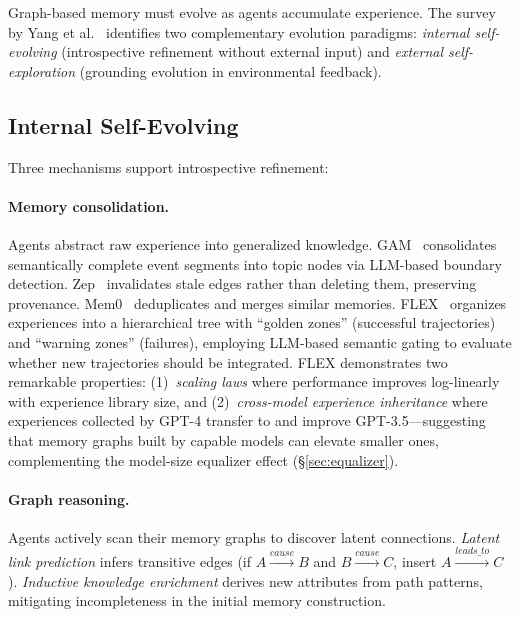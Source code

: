 \documentclass[hf]{ceurart}
\begin{document}
Graph-based memory must evolve as agents accumulate experience.
The survey by Yang et al.~\cite{graphmemsurvey2026} identifies two
complementary evolution paradigms: \emph{internal self-evolving}
(introspective refinement without external input) and \emph{external
self-exploration} (grounding evolution in environmental feedback).

\subsection{Internal Self-Evolving}

Three mechanisms support introspective refinement:

\paragraph{Memory consolidation.}
Agents abstract raw experience into generalized knowledge.
GAM~\cite{gam2026} consolidates semantically complete event segments
into topic nodes via LLM-based boundary detection.
Zep~\cite{rasmussen2025} invalidates stale edges rather than deleting
them, preserving provenance. Mem0~\cite{mem0_2025} deduplicates and
merges similar memories. FLEX~\cite{flex2025} organizes experiences
into a hierarchical tree with ``golden zones'' (successful trajectories)
and ``warning zones'' (failures), employing LLM-based semantic gating
to evaluate whether new trajectories should be integrated. FLEX
demonstrates two remarkable properties: (1)~\emph{scaling laws} where
performance improves log-linearly with experience library size, and
(2)~\emph{cross-model experience inheritance} where experiences
collected by GPT-4 transfer to and improve GPT-3.5---suggesting that
memory graphs built by capable models can elevate smaller ones,
complementing the model-size equalizer effect
(\S\ref{sec:equalizer}).

\paragraph{Graph reasoning.}
Agents actively scan their memory graphs to discover latent connections.
\emph{Latent link prediction} infers transitive edges
(if $A \xrightarrow{cause} B$ and $B \xrightarrow{cause} C$,
insert $A \xrightarrow{leads\_to} C$). \emph{Inductive knowledge
enrichment} derives new attributes from path patterns, mitigating
incompleteness in the initial memory construction.
\end{document}
